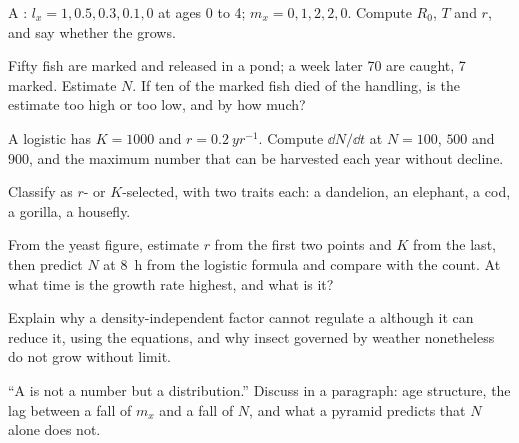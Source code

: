 \begin{exercise}[$\star\star$]\label{exo:b1:populations:6}
A : $l_x = 1, 0.5, 0.3, 0.1, 0$ at ages 0 to 4; $m_x = 0,
1, 2, 2, 0$. Compute $R_0$, $T$ and $r$, and say whether the
 grows.
\end{exercise}

\begin{exercise}[$\star\star$]\label{exo:b1:populations:7}
Fifty fish are marked and released in a pond; a week later 70 are
caught, 7 marked. Estimate $N$. If ten of the marked fish died of the
handling, is the estimate too high or too low, and by how much?
\end{exercise}

\begin{exercise}[$\star\star$]\label{exo:b1:populations:8}
A logistic  has $K = 1000$ and $r = \qty{0.2}{yr^{-1}}$.
Compute $\dd N/\dd t$ at $N = 100$, $500$ and $900$, and the maximum
number that can be harvested each year without decline.
\end{exercise}

\begin{exercise}[$\star\star$]\label{exo:b1:populations:9}
Classify as $r$- or $K$-selected, with two traits each: a dandelion,
an elephant, a cod, a gorilla, a housefly.
\end{exercise}

\begin{exercise}[$\star\star\star$]\label{exo:b1:populations:10}
From the yeast figure, estimate $r$ from the first two points and $K$
from the last, then predict $N$ at \qty{8}{h} from the logistic
formula and compare with the count. At what time is the growth rate
highest, and what is it?
\end{exercise}

\begin{exercise}[$\star\star\star$]\label{exo:b1:populations:11}
Explain why a density-independent factor cannot regulate a 
although it can reduce it, using the equations, and why insect
 governed by weather nonetheless do not grow without
limit.
\end{exercise}

\begin{exercise}[$\star\star\star$]\label{exo:b1:populations:12}
``A  is not a number but a distribution.'' Discuss in a
paragraph: age structure, the lag between a fall of $m_x$ and a fall
of $N$, and what a pyramid predicts that $N$ alone does not.
\end{exercise}

